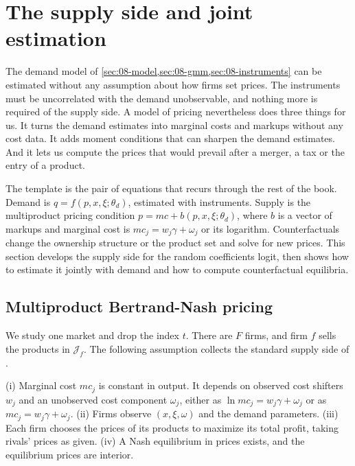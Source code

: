 \section{The supply side and joint estimation}\label{sec:08-supply}

The demand model of \cref{sec:08-model,sec:08-gmm,sec:08-instruments} can be estimated without any assumption
about how firms set prices. The instruments must be uncorrelated with the demand unobservable, and nothing more is
required of the supply side. A model of pricing nevertheless does three things for us. It turns the demand estimates
into marginal costs and markups without any cost data. It adds moment conditions that can sharpen the demand
estimates. And it lets us compute the prices that would prevail after a merger, a tax or the entry of a product.

The template is the pair of equations that recurs through the rest of the book. Demand is
$q = f(p, x, \xi; \theta_d)$, estimated with instruments. Supply is the multiproduct pricing condition
$p = mc + b(p, x, \xi; \theta_d)$, where $b$ is a vector of markups and marginal cost is $mc_j = w_j\gamma + \omega_j$
or its logarithm. Counterfactuals change the ownership structure or the product set and solve for new prices. This
section develops the supply side for the random coefficients logit, then shows how to estimate it jointly with demand
and how to compute counterfactual equilibria.

\subsection{Multiproduct Bertrand-Nash pricing}\label{sec:08-supply-foc}

We study one market and drop the index $t$. There are $F$ firms, and firm $f$ sells the products in
$\mathcal{J}_f$. The following assumption collects the standard supply side of \citet[Section~3]{BerryLevinsohnPakes1995}.

\begin{assumption}\label{ass:08-supply}
(i) Marginal cost $mc_j$ is constant in output. It depends on observed cost shifters $w_j$ and an unobserved cost
component $\omega_j$, either as $\ln mc_j = w_j\gamma + \omega_j$ or as $mc_j = w_j\gamma + \omega_j$. (ii) Firms
observe $(x, \xi, \omega)$ and the demand parameters. (iii) Each firm chooses the prices of its products to maximize
its total profit, taking rivals' prices as given. (iv) A Nash equilibrium in prices exists, and the equilibrium prices
are interior.
\end{assumption}

